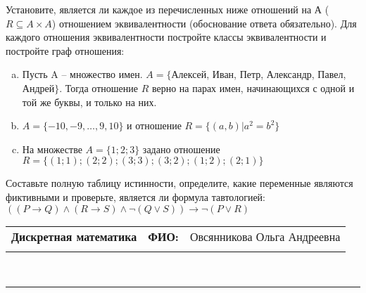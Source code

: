 \documentclass[10pt]{exam}
\newcommand{\class}{Дискретная математика}
\newcommand{\examdate}{}
\begin{document}
\begin{questions}
\question
Установите, является ли каждое из перечисленных ниже отношений на А ($R \subseteq A \times A$) отношением эквивалентности (обоснование ответа обязательно). Для каждого отношения эквивалентности постройте классы 
эквивалентности и постройте граф отношения:
\begin{enumerate} [a)]\setcounter{enumi}{0}
\item Пусть A – множество имен. $A = \{ $Алексей, Иван, Петр, Александр, Павел, Андрей$ \}$. Тогда отношение $R$ верно на парах имен, начинающихся с одной и той же буквы, и только на них.
\item $A = \{-10, -9, … , 9, 10\}$ и отношение $ R = \{(a,b)|a^{2} = b^{2}\}$
\item На множестве $A = \{1; 2; 3\}$ задано отношение $R = \{(1; 1); (2; 2); (3; 3); (3; 2); (1; 2); (2; 1)\}$
\end{enumerate}\question Составьте полную таблицу истинности, определите, какие переменные являются фиктивными и проверьте, является ли формула тавтологией:
$((P \rightarrow Q) \land (R \rightarrow S) \land \neg (Q \lor S)) \rightarrow \neg (P \lor R)$

\end{questions}
\newpage
\begin{flushright}
\begin{tabular}{p{2.8in} r l}
\textbf{\class} & \textbf{ФИО:} &Овсянникова Ольга Андреевна
\\

\textbf{\examdate} &&\\
\end{tabular}\\
\end{flushright}
\rule[1ex]{\textwidth}{.1pt}
\end{document}
